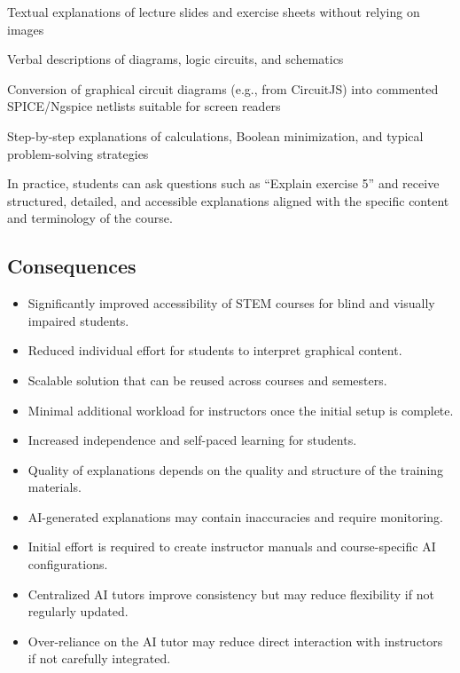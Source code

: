 Textual explanations of lecture slides and exercise sheets without relying on images

Verbal descriptions of diagrams, logic circuits, and schematics

Conversion of graphical circuit diagrams (e.g., from CircuitJS) into commented SPICE/Ngspice netlists suitable for screen readers

Step-by-step explanations of calculations, Boolean minimization, and typical problem-solving strategies

In practice, students can ask questions such as “Explain exercise 5” and receive structured, detailed, and accessible explanations aligned with the specific content and terminology of the course.




\subsection*{Consequences}





\renewcommand{\labelenumi}{$+$}
\begin{itemize}
    \item Significantly improved accessibility of STEM courses for blind and visually impaired students.
    
    \item Reduced individual effort for students to interpret graphical content.
    
    \item Scalable solution that can be reused across courses and semesters.
    
    \item Minimal additional workload for instructors once the initial setup is complete.
    
    \item Increased independence and self-paced learning for students.
\end{itemize}

\renewcommand{\labelenumi}{$-$}
\begin{itemize}
    \item Quality of explanations depends on the quality and structure of the training materials.
    
    \item AI-generated explanations may contain inaccuracies and require monitoring.
    
    \item Initial effort is required to create instructor manuals and course-specific AI configurations.
    \item Centralized AI tutors improve consistency but may reduce flexibility if not regularly updated.
    \item Over-reliance on the AI tutor may reduce direct interaction with instructors if not carefully integrated.
\end{itemize}
 

